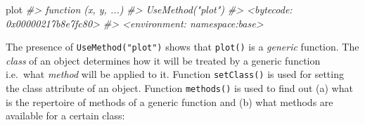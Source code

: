 \documentclass[
]{book}
\newenvironment{Shaded}{\begin{snugshade}}{\end{snugshade}}
\newcommand{\CommentTok}[1]{\textcolor[rgb]{0.56,0.35,0.01}{\textit{#1}}}
\newcommand{\NormalTok}[1]{#1}
\begin{document}
\begin{Shaded}
\begin{Highlighting}[]
\NormalTok{plot}
\CommentTok{\#\textgreater{} function (x, y, ...) }
\CommentTok{\#\textgreater{} UseMethod("plot")}
\CommentTok{\#\textgreater{} \textless{}bytecode: 0x00000217b8e7fc80\textgreater{}}
\CommentTok{\#\textgreater{} \textless{}environment: namespace:base\textgreater{}}
\end{Highlighting}
\end{Shaded}

The presence of \texttt{UseMethod("plot")} shows that \texttt{plot()} is a \emph{{generic}} function. The \emph{{class}} of an object determines how it will be treated by a generic function i.e.~what \emph{{method}} will be applied to it. Function \texttt{setClass()} is used for setting the class attribute of an object. Function \texttt{methods()} is used to find out (a) what is the repertoire of methods of a generic function and (b) what methods are available for a certain class:
\end{document}
